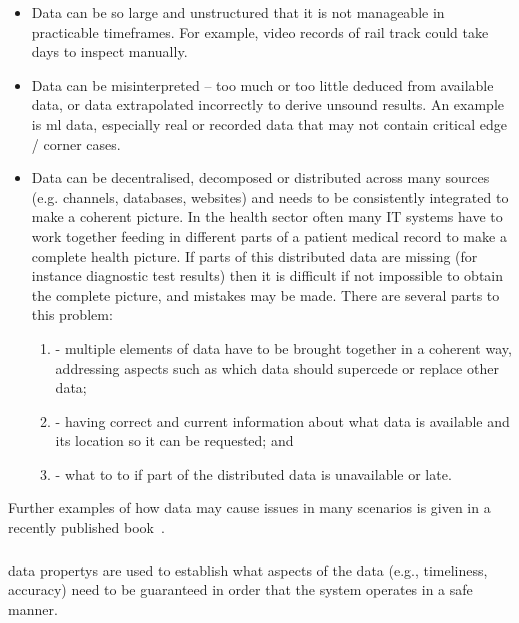 \begin{itemize}
  \item {} Data can be so large and unstructured that it is not manageable in practicable timeframes.
    For example, video records of rail track could take days to inspect manually.

  \item {} Data can be misinterpreted -- too much or too little deduced from available data, or data extrapolated incorrectly to derive unsound results.
    An example is \gls{ml} data, especially real or recorded data that may not contain critical edge / corner cases.

  \item {}
    Data can be decentralised, decomposed or distributed across many sources (e.g. channels, \glspl{database}, websites) and needs to be consistently integrated to make a coherent picture. In the health sector often many IT systems have to work together feeding in different parts of a patient medical record to make a complete health picture. If parts of this distributed data are missing (for instance diagnostic test results) then it is difficult if not impossible to obtain the complete picture, and mistakes may be made.
    There are several parts to this problem:
    \begin{enumerate}[label=\alph*]
    	\item {} - multiple elements of data have to be brought together in a coherent way, addressing aspects such as which data should supercede or replace other data;
    	\item {} - having correct and current \gls{information} about what data is available and its location so it can be requested; and
    	\item {} - what to to if part of the distributed data is unavailable or late.
    \end{enumerate}
\end{itemize}


Further examples of how data may cause issues in many scenarios is given in a recently published book~\cite{citation:datacentric}.

\subsubsection{}\label{bkm:guidance:dataproperties}
\Glspl{data property} are used to establish what aspects of the data (e.g., \gls{timeliness}, \gls{accuracy}) need to be guaranteed in order that the system operates in a safe manner.

